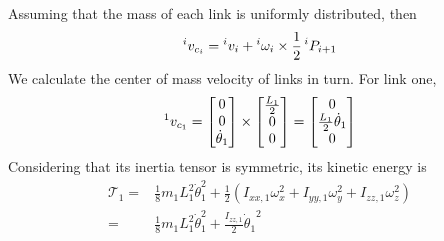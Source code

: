 \documentclass{article}
\begin{document}
Assuming that the mass of each link is uniformly distributed, then
\[
\prescript{i}{}{v_{c_{i}}}
    = \prescript{i}{}{v_i} + \prescript{i}{ }{\omega_i} \times \frac{1}{2} \prescript{i}{}{P_{i+1}}
\]
We calculate the center of mass velocity of links in turn. For link one,
\[
    \prescript{1}{}{v_{c_1}} = \begin{bmatrix}
        0 \\ 0 \\ \dot\theta_1
    \end{bmatrix} \times \begin{bmatrix}
        \frac{L_1}{2} \\ 0 \\ 0
    \end{bmatrix} = \begin{bmatrix}
       0 \\ \frac{L_1}{2} \dot \theta_1 \\ 0
    \end{bmatrix}
\]
Considering that its inertia tensor is symmetric, its kinetic energy is
\[
    \begin{aligned}
        \mathcal T_1
        = & \frac{1}{8} m_1 L_1^2 \dot\theta_1^2 + \frac{1}{2} (I_{xx,1} \omega_x^2 + I_{yy,1} \omega_y^2 + I_{zz,1} \omega_z^2) \\
        = & \frac{1}{8} m_1 L_1^2 \dot\theta_1^2 + \frac{I_{zz,1}}{2} {\dot \theta_1}^2
    \end{aligned}
\]
\end{document}
